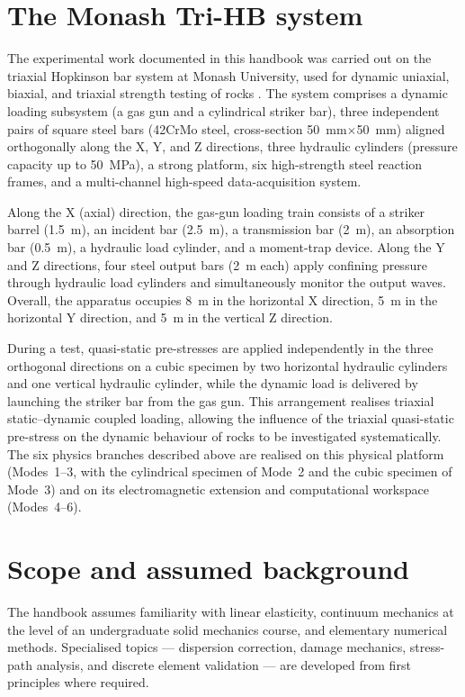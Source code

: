 \documentclass[11pt,a4paper,openany]{book}
\providecommand{\SI}[2]{\qty{#1}{#2}}
\theoremstyle{handbook}
\begin{document}
\section{The Monash Tri-HB system}\label{sec:monash-trihb}

The experimental work documented in this handbook was carried out on the
triaxial Hopkinson bar system at Monash University, used for dynamic
uniaxial, biaxial, and triaxial strength testing of rocks
\cite{Liu2019,Zhang2019Tri}. The system comprises a dynamic loading
subsystem (a gas gun and a cylindrical striker bar), three independent pairs
of square steel bars (42CrMo steel, cross-section
\SI{50}{mm}$\times$\SI{50}{mm}) aligned orthogonally along the X, Y, and Z
directions, three hydraulic cylinders (pressure capacity up to \SI{50}{MPa}),
a strong platform, six high-strength steel reaction frames, and a
multi-channel high-speed data-acquisition system.

Along the X (axial) direction, the gas-gun loading train consists of a
striker barrel (\SI{1.5}{m}), an incident bar (\SI{2.5}{m}), a transmission
bar (\SI{2}{m}), an absorption bar (\SI{0.5}{m}), a hydraulic load cylinder,
and a moment-trap device. Along the Y and Z directions, four steel output
bars (\SI{2}{m} each) apply confining pressure through hydraulic load
cylinders and simultaneously monitor the output waves. Overall, the
apparatus occupies \SI{8}{m} in the horizontal X direction, \SI{5}{m} in the
horizontal Y direction, and \SI{5}{m} in the vertical Z direction.

During a test, quasi-static pre-stresses are applied independently in the
three orthogonal directions on a cubic specimen by two horizontal hydraulic
cylinders and one vertical hydraulic cylinder, while the dynamic load is
delivered by launching the striker bar from the gas gun. This arrangement
realises triaxial static--dynamic coupled loading, allowing the influence of
the triaxial quasi-static pre-stress on the dynamic behaviour of rocks to be
investigated systematically. The six physics branches described above are
realised on this physical platform (Modes~1--3, with the cylindrical
specimen of Mode~2 and the cubic specimen of Mode~3) and on its
electromagnetic extension and computational workspace (Modes~4--6).

\section{Scope and assumed background}

The handbook assumes familiarity with linear elasticity, continuum mechanics
at the level of an undergraduate solid mechanics course, and elementary
numerical methods. Specialised topics --- dispersion correction, damage
mechanics, stress-path analysis, and discrete element validation --- are
developed from first principles where required.
\end{document}
